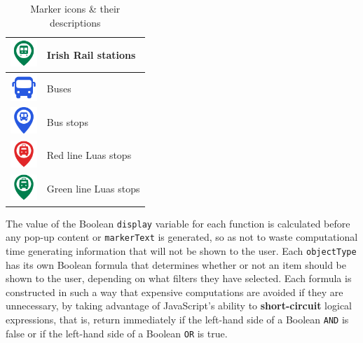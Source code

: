 \documentclass[a4paper,11pt]{report}
\begin{document}
\begin{table}[H]
\begin{tabular}{|>{\centering\arraybackslash}m{1.8cm}|m{10cm}|}
    \vspace{2mm}\includegraphics[width=1cm]{../frontend/src/assets/icons/train-station.png}\supercite{trainstaitionicon} & Irish Rail stations \\
    \hline

    \vspace{2mm}\includegraphics[width=1cm]{../frontend/src/assets/icons/bus.png}\supercite{busicon} & Buses \\
    \hline
    \vspace{2mm}\includegraphics[width=1cm]{../frontend/src/assets/icons/bus-station.png}\supercite{busstopicon} & Bus stops \\
    \hline

    \vspace{2mm}\includegraphics[width=1cm]{../frontend/src/assets/icons/luasRed.png}\supercite{tramicon} & Red line Luas stops \\
    \hline
    \vspace{2mm}\includegraphics[width=1cm]{../frontend/src/assets/icons/luasGreen.png}\supercite{tramicon} & Green line Luas stops \\
    \hline
  \end{tabular}
  \caption{Marker icons \& their descriptions}
\end{table}

The value of the Boolean \verb|display| variable for each function is calculated before any pop-up content or \verb|markerText| is generated, so as not to waste computational time generating information that will not be shown to the user. 
Each \verb|objectType| has its own Boolean formula that determines whether or not an item should be shown to the user, depending on what filters they have selected.
Each formula is constructed in such a way that expensive computations are avoided if they are unnecessary, by taking advantage of JavaScript's ability to \textbf{short-circuit} logical expressions, that is, return immediately if the left-hand side of a Boolean \verb|AND| is false\supercite{logicaland} or if the left-hand side of a Boolean \verb|OR| is true\supercite{logicalor}.
\end{document}
